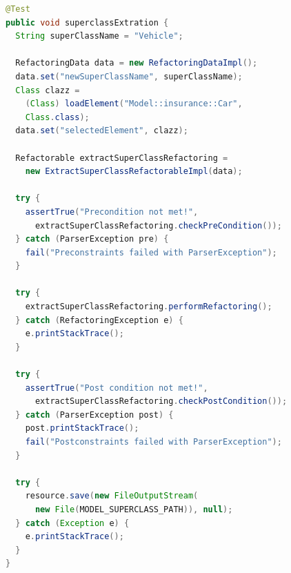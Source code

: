 \documentclass{llncs}
\begin{document}
\begin{lstlisting}[language=Java,caption=Execution of the \textit{extract superClass} refactoring as test,label=lst:extractSuperclassTest]
@Test
public void superclassExtration {
  String superClassName = "Vehicle";

  RefactoringData data = new RefactoringDataImpl();
  data.set("newSuperClassName", superClassName);
  Class clazz = 
    (Class) loadElement("Model::insurance::Car", 
    Class.class);
  data.set("selectedElement", clazz);

  Refactorable extractSuperClassRefactoring = 
    new ExtractSuperClassRefactorableImpl(data);

  try {
    assertTrue("Precondition not met!", 
      extractSuperClassRefactoring.checkPreCondition());
  } catch (ParserException pre) {
    fail("Preconstraints failed with ParserException");
  }

  try {
    extractSuperClassRefactoring.performRefactoring();
  } catch (RefactoringException e) {
    e.printStackTrace();
  }

  try {
    assertTrue("Post condition not met!", 
      extractSuperClassRefactoring.checkPostCondition());
  } catch (ParserException post) {
    post.printStackTrace();
    fail("Postconstraints failed with ParserException");
  }

  try {
    resource.save(new FileOutputStream(
      new File(MODEL_SUPERCLASS_PATH)), null);
  } catch (Exception e) {
    e.printStackTrace();
  }
}
\end{lstlisting}
\end{document}
